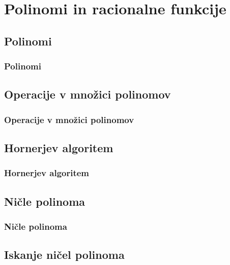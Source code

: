 \section{Polinomi in racionalne funkcije}

\begin{frame}
    \sectionpage
\end{frame}

\begin{frame}
\end{frame}

    \subsection{Polinomi}

        \begin{frame}
            \frametitle{Polinomi}
        \end{frame}

    \subsection{Operacije v množici polinomov}

        \begin{frame}
            \frametitle{Operacije v množici polinomov}
        \end{frame}

    \subsection{Hornerjev algoritem}

        \begin{frame}
            \frametitle{Hornerjev algoritem}
        \end{frame}

    \subsection{Ničle polinoma}

        \begin{frame}
            \frametitle{Ničle polinoma}
        \end{frame}

    \subsection{Iskanje ničel polinoma}

